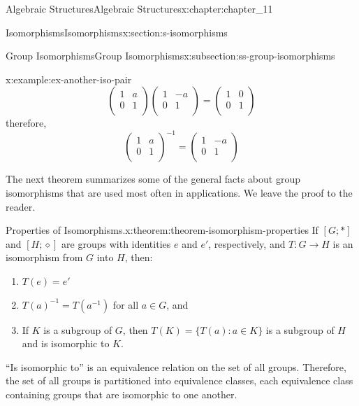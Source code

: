 \documentclass[oneside,10pt,]{book}
\numberwithin{equation}{section}
\begin{document}
\begin{chapterptx}{Algebraic Structures}{}{Algebraic Structures}{}{}{x:chapter:chapter_11}
\begin{sectionptx}{Isomorphisms}{}{Isomorphisms}{}{}{x:section:s-isomorphisms}
\begin{subsectionptx}{Group Isomorphisms}{}{Group Isomorphisms}{}{}{x:subsection:ss-group-isomorphisms}
\begin{example}{}{x:example:ex-another-iso-pair}
\begin{equation*}
\left(
\begin{array}{cc}
1 & a \\
0 & 1 \\
\end{array}
\right)\left(
\begin{array}{cc}
1 & -a \\
0 & 1 \\
\end{array}
\right)=\left(
\begin{array}{cc}
1 & 0 \\
0 & 1 \\
\end{array}
\right)
\end{equation*}
therefore,%
\begin{equation*}
\left(
\begin{array}{cc}
1 & a \\
0 & 1 \\
\end{array}
\right)^{-1}= \left(
\begin{array}{cc}
1 & -a \\
0 & 1 \\
\end{array}
\right)
\end{equation*}
%
\end{example}
The next theorem summarizes some of the general facts about group isomorphisms that are used most often in applications.  We leave the proof to the reader.%
\begin{theorem}{Properties of Isomorphisms.}{}{x:theorem:theorem-isomorphism-properties}%
If \([G;*]\) and \([H;\diamond ]\) are groups with identities \(e\) and \(e'\), respectively, and \(T:G \to H\) is an isomorphism from \(G\) into \(H\), then:%
\begin{enumerate}[label=(\alph*)]
\item{}\(T(e) = e'\)%
\item{}\(T(a)^{-1} = T\left(a^{-1}\right)\) for all \(a \in G\), and%
\item{}If \(K\) is a subgroup of \(G\), then \(T(K) = \{T(a) : a \in K\}\) is a subgroup of \(H\) and is isomorphic to \(K\).%
\end{enumerate}
%
\end{theorem}
``Is isomorphic to'' is an equivalence relation on the set of all groups. Therefore, the set of all groups is partitioned into equivalence classes, each equivalence class containing groups that are isomorphic to one another.%
\end{subsectionptx}

\end{sectionptx}
\end{chapterptx}
\end{document}
